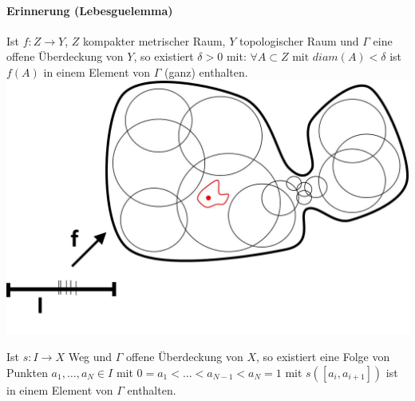 \documentclass[a4paper,11pt,notitlepage]{report}
\theoremstyle{definition}
\begin{document}
\paragraph{Erinnerung (Lebesguelemma)}
Ist $f \colon Z \rightarrow Y$, $Z$ kompakter metrischer Raum, $Y$ topologischer Raum und $\Gamma$ eine offene Überdeckung von $Y$, so existiert $\delta > 0$ mit: \newline  $\forall A \subset Z \text{ mit } diam(A) < \delta$ ist $f(A)$ in einem Element von $\Gamma$ (ganz) enthalten. \newline \includegraphics[scale=0.4]{images/Lebesguelemma.jpg}

\begin{corollary}{}
	Ist $s \colon I \rightarrow X$ Weg und $\Gamma$ offene Überdeckung von $X$, so existiert eine Folge von Punkten \newline $a_1, \ldots, a_N \in I$ mit $0 = a_1 < \ldots < a_{N-1} < a_N = 1$ mit \newline $s([a_i, a_{i+1}])$ ist in einem Element von $\Gamma$ enthalten.
\end{corollary}
\end{document}
